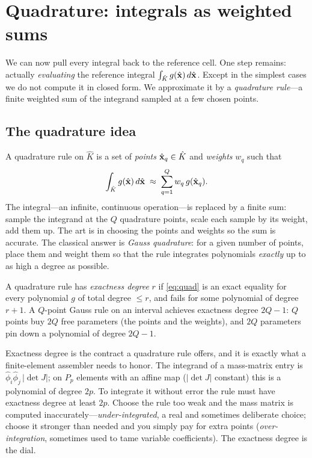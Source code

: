\section{Quadrature: integrals as weighted sums}
\label{sec:quad}

We can now pull every integral back to the reference cell. One step remains: actually
\emph{evaluating} the reference integral $\int_{\hat K} g(\hat{\mathbf{x}})\,d\hat{\mathbf{x}}$. Except
in the simplest cases we do not compute it in closed form. We approximate it by a
\emph{quadrature rule}---a finite weighted sum of the integrand sampled at a few
chosen points.

\subsection{The quadrature idea}

A quadrature rule on $\hat K$ is a set of \emph{points} $\hat{\mathbf{x}}_q\in\hat K$ and
\emph{weights} $w_q$ such that
\begin{equation}
  \int_{\hat K} g(\hat{\mathbf{x}})\,d\hat{\mathbf{x}} \;\approx\; \sum_{q=1}^{Q} w_q\,g(\hat{\mathbf{x}}_q).
  \label{eq:quad}
\end{equation}
The integral---an infinite, continuous operation---is replaced by a finite sum: sample
the integrand at the $Q$ quadrature points, scale each sample by its weight, add them
up. The art is in choosing the points and weights so the sum is accurate. The
classical answer is \emph{Gauss quadrature}: for a given number of points, place them
and weight them so that the rule integrates polynomials \emph{exactly} up to as high
a degree as possible.

\begin{definition}
A quadrature rule has \emph{exactness degree} $r$ if \eqref{eq:quad} is an exact
equality for every polynomial $g$ of total degree $\le r$, and fails for some
polynomial of degree $r+1$. A $Q$-point Gauss rule on an interval achieves exactness
degree $2Q-1$: $Q$ points buy $2Q$ free parameters (the points and the weights), and
$2Q$ parameters pin down a polynomial of degree $2Q-1$.
\end{definition}

Exactness degree is the contract a quadrature rule offers, and it is exactly what a
finite-element assembler needs to honor. The integrand of a mass-matrix entry is
$\hat\phi_i\hat\phi_j\,|\det J|$; on $P_p$ elements with an affine map ($|\det J|$
constant) this is a polynomial of degree $2p$. To integrate it without error the rule
must have exactness degree at least $2p$. Choose the rule too weak and the mass matrix
is computed inaccurately---\emph{under-integrated}, a real and sometimes deliberate
choice; choose it stronger than needed and you simply pay for extra points
(\emph{over-integration}, sometimes used to tame variable coefficients). The
exactness degree is the dial.


